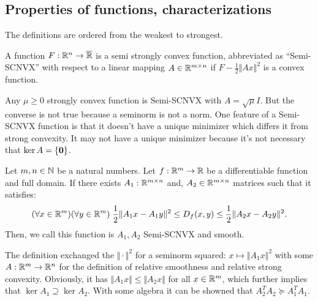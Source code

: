 \documentclass[12pt]{article}
\begin{document}
    \subsection{Properties of functions, characterizations}
        The definitions are ordered from the weakest to strongest. 
        \begin{definition}\label{def:semi-scnvx}
            A function $F: \mathbb R^n \rightarrow \overline {\mathbb R}$ is a semi strongly convex function, abbreviated as ``Semi-SCNVX'' with respect to a linear mapping $A \in \mathbb R^{m \times n}$ if $F - \frac{1}{2}\Vert Ax\Vert^2$ is a convex function. 
        \end{definition}
        \begin{remark}
            Any $\mu \ge 0$ strongly convex function is Semi-SCNVX with $A = \sqrt{\mu}I$. 
            But the converse is not true because a seminorm is not a norm. 
            One feature of a Semi-SCNVX function is that it doesn't have a unique minimizer which differs it from strong convexity. 
            It may not have a unique minimizer because it's not necessary that $\operatorname{ker} A = \{\mathbf 0\}$. 
        \end{remark}
        \begin{definition}\label{def:seminorm-smooth-scnvx}
            Let $m, n\in \mathbb N$ be a natural numbers. 
            Let $f:\mathbb R^m \rightarrow \mathbb R$ be a differentiable function and full domain. 
            If there exists $A_1: \mathbb R^{m\times n}$ and, $A_2 \in \mathbb R^{m \times n}$ matrices such that it satisfies:
            \begin{align*}
                (\forall x \in \mathbb R^m)(\forall y \in \mathbb R^m)\;
                \frac{1}{2}\Vert A_1x - A_1y\Vert^2 \le 
                D_f(x, y) \le \frac{1}{2}\Vert A_2x - A_2y\Vert^2. 
            \end{align*}
            Then, we call this function is $A_1, A_2$ Semi-SCNVX and smooth. 
        \end{definition}
        \begin{remark}
            The definition exchanged the $\Vert \cdot\Vert^2$ for a seminorm squared: $x \mapsto \Vert A_1x\Vert^2$ with some $A: \mathbb R^m \rightarrow \mathbb R^n$ for the definition of relative smoothness and relative strong convexity. 
            Obviously, it has $\Vert A_1x\Vert \le \Vert A_2x\Vert$ for all $x\in \mathbb R^m$, which further implies that $\ker A_1\supseteq\ker A_2$.
            With some algebra it can be showned that $A^T_2A_2 \succeq A^T_1A_1$. 
        \end{remark}
\end{document}
